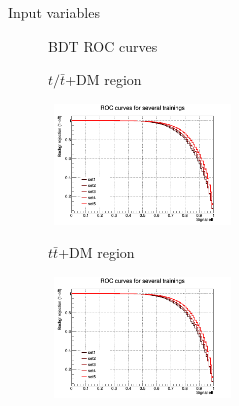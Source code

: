 \documentclass[8pt]{beamer}
\begin{document}
\begin{frame}{Input variables}
\justifying

\begin{figure}[htbp]
\centering
\begin{block}{ \centering BDT ROC curves}\end{block}
\begin{minipage}[b]{.48\textwidth}
\begin{center} \vspace{-8pt}
\begin{block}{\centering $t/\bar t$+DM region}\end{block}
\includegraphics[width=5cm, height=3.2cm]{figs/BDT_input_ST.png}
\end{center}
\end{minipage}\hfill
\begin{minipage}[b]{.48\textwidth}
\begin{center}  \vspace{-8pt}
\begin{block}{\centering $t \bar t$+DM region}\end{block}
\includegraphics[width=5cm, height=3.2cm]{figs/BDT_input_TTbar.png}
\end{center}
\end{minipage}\hfill


\end{figure}
\end{frame}
\end{document}
